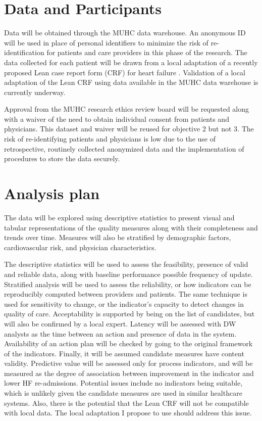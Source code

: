 \section{Data and Participants}
Data will be obtained through the MUHC data warehouse. An anonymous ID will be used in place of personal identifiers to minimize the risk of re-identification for patients and care providers in this phase of the research. The data collected for each patient will be drawn from a local adaptation of a recently proposed Lean case report form (\gls{CRF}) for heart failure \cite{psotka2019design}. Validation of a local adaptation of the Lean CRF using data available in the MUHC data warehouse is currently underway. 

Approval from the MUHC research ethics review board will be requested along with a waiver of the need to obtain individual consent from patients and physicians. This dataset and waiver will be reused for objective 2 but not 3. The risk of re-identifying patients and physicians is low due to the use of retrospective, routinely collected anonymized data and the implementation of procedures to store the data securely.

\section{Analysis plan}
The data will be explored using descriptive statistics to present visual and tabular representations of the quality measures along with their completeness and trends over time. Measures will also be stratified by demographic factors, cardiovascular risk, and physician characteristics.

The descriptive statistics will be used to assess the feasibility, presence of valid and reliable data, along with baseline performance possible frequency of update. Stratified analysis will be used to assess the reliability, or how indicators can be reproducibly computed between providers and patients. The same technique is used for sensitivity to change, or the indicator's capacity to detect changes in quality of care. Acceptability is supported by being on the list of candidates, but will also be confirmed by a local expert. Latency will be assessed with DW analysts as the time between an action and presence of data in the system. Availability of an action plan will be checked by going to the original framework of the indicators. Finally, it will be assumed candidate measures have content validity. Predictive value will be assessed only for process indicators, and will be measured as the degree of association between improvement in the indicator and lower HF re-admissions.
Potential issues include no indicators being suitable, which is unlikely given the candidate measures are used in similar healthcare systems. Also, there is the potential that the Lean CRF will not be compatible with local data. The local adaptation I propose to use should address this issue.

